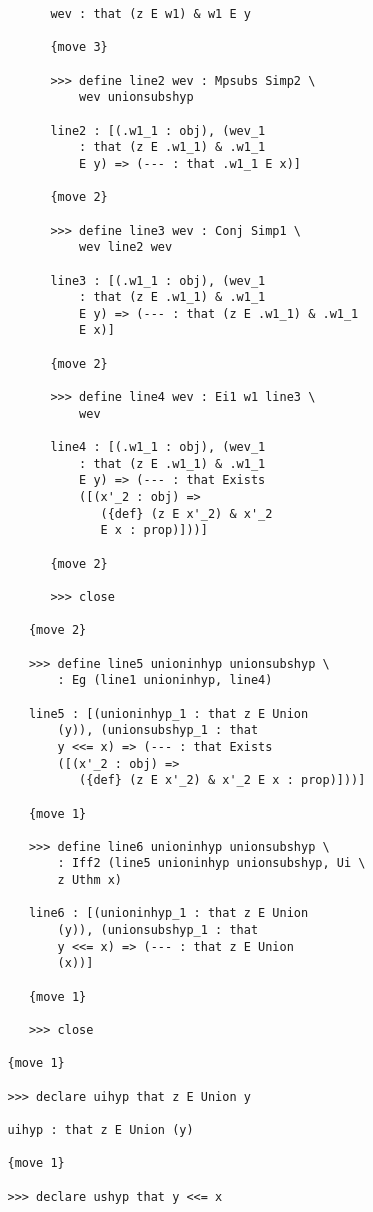 \documentclass[12pt]{article}
\begin{document}
\begin{verbatim}
         wev : that (z E w1) & w1 E y

         {move 3}

         >>> define line2 wev : Mpsubs Simp2 \
             wev unionsubshyp

         line2 : [(.w1_1 : obj), (wev_1 
             : that (z E .w1_1) & .w1_1 
             E y) => (--- : that .w1_1 E x)]

         {move 2}

         >>> define line3 wev : Conj Simp1 \
             wev line2 wev

         line3 : [(.w1_1 : obj), (wev_1 
             : that (z E .w1_1) & .w1_1 
             E y) => (--- : that (z E .w1_1) & .w1_1 
             E x)]

         {move 2}

         >>> define line4 wev : Ei1 w1 line3 \
             wev

         line4 : [(.w1_1 : obj), (wev_1 
             : that (z E .w1_1) & .w1_1 
             E y) => (--- : that Exists 
             ([(x'_2 : obj) => 
                ({def} (z E x'_2) & x'_2 
                E x : prop)]))]

         {move 2}

         >>> close

      {move 2}

      >>> define line5 unioninhyp unionsubshyp \
          : Eg (line1 unioninhyp, line4)

      line5 : [(unioninhyp_1 : that z E Union 
          (y)), (unionsubshyp_1 : that 
          y <<= x) => (--- : that Exists 
          ([(x'_2 : obj) => 
             ({def} (z E x'_2) & x'_2 E x : prop)]))]

      {move 1}

      >>> define line6 unioninhyp unionsubshyp \
          : Iff2 (line5 unioninhyp unionsubshyp, Ui \
          z Uthm x)

      line6 : [(unioninhyp_1 : that z E Union 
          (y)), (unionsubshyp_1 : that 
          y <<= x) => (--- : that z E Union 
          (x))]

      {move 1}

      >>> close

   {move 1}

   >>> declare uihyp that z E Union y

   uihyp : that z E Union (y)

   {move 1}

   >>> declare ushyp that y <<= x


\end{verbatim}
\end{document}
